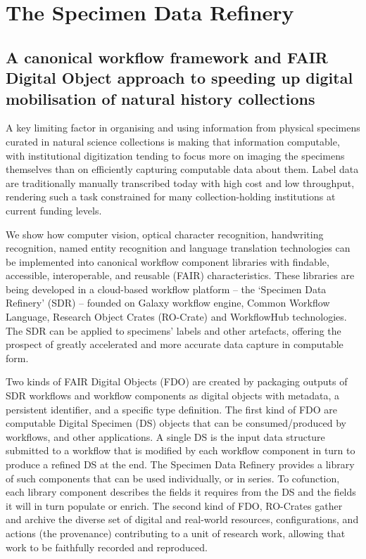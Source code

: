 \section{The Specimen Data Refinery}
\label{the-specimen-data-refinery}

\subsection*{A canonical workflow framework and FAIR Digital Object
approach to speeding up digital mobilisation of natural history
collections}

A key limiting factor in organising and using information from physical
specimens curated in natural science collections is making that
information computable, with institutional digitization tending to focus
more on imaging the specimens themselves than on efficiently capturing
computable data about them. Label data are traditionally manually
transcribed today with high cost and low throughput, rendering such a
task constrained for many collection-holding institutions at current
funding levels.

We show how computer vision, optical character recognition, handwriting
recognition, named entity recognition and language translation
technologies can be implemented into canonical workflow component
libraries with findable, accessible, interoperable, and reusable (FAIR)
characteristics. These libraries are being developed in a cloud-based
workflow platform -- the `Specimen Data Refinery' (SDR) -- founded on
Galaxy workflow engine, Common Workflow Language, Research Object Crates
(RO-Crate) and WorkflowHub technologies. The SDR can be applied to
specimens' labels and other artefacts, offering the prospect of greatly
accelerated and more accurate data capture in computable form.

Two kinds of FAIR Digital Objects (FDO) are created by packaging outputs
of SDR workflows and workflow components as digital objects with
metadata, a persistent identifier, and a specific type definition. The
first kind of FDO are computable Digital Specimen (DS) objects that can
be consumed/produced by workflows, and other applications. A single DS
is the input data structure submitted to a workflow that is modified by
each workflow component in turn to produce a refined DS at the end. The
Specimen Data Refinery provides a library of such components that can be
used individually, or in series. To cofunction, each library component
describes the fields it requires from the DS and the fields it will in
turn populate or enrich. The second kind of FDO, RO-Crates gather and
archive the diverse set of digital and real-world resources,
configurations, and actions (the provenance) contributing to a unit of
research work, allowing that work to be faithfully recorded and
reproduced.

